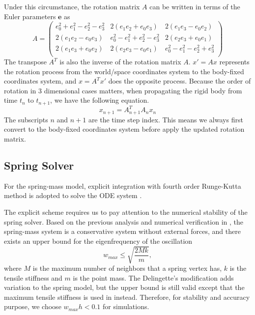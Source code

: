 Under this circumstance, the rotation matrix $A$ can be written in terms of 
the Euler parameters $\mathbf{e}$ as
\begin{equation}
A =\left(
\begin{array}{ccc}
e_0^2+e_1^2-e_2^2-e_3^2 & 2(e_1e_2+e_0e_3) & 2(e_1e_3-e_0e_2) \\
2(e_1e_2-e_0e_3) & e_0^2-e_1^2+e_2^2-e_3^2 & 2(e_2e_3+e_0e_1) \\
2(e_1e_3+e_0e_2) & 2(e_2e_3-e_0e_1) & e_0^2-e_1^2-e_2^2+e_3^2 \\
\end{array}
\right)
\label{eqn:rotation_matrix}
\end{equation}
The transpose $A^T$ is also the inverse of the rotation matrix $A$. 
$x' = Ax$ represents the rotation process from the world/space coordinates 
system to the body-fixed coordinates system, and $x = A^Tx'$ does the 
opposite process. 
Because the order of rotation in 3 dimensional cases matters, when 
propagating the rigid body from time $t_n$ to $t_{n+1}$, we have the 
following equation.
\begin{equation}
x_{n+1} = A^T_{n+1} A_n x_n
\end{equation}
The subscripts $n$ and $n+1$ are the time step index. This means we always 
first convert to the body-fixed coordinates system before apply the updated 
rotation matrix. 



\subsection{Spring Solver}
\label{Sec:SS}
For the spring-mass model, explicit integration with fourth order 
Runge-Kutta method  is adopted to solve the ODE system 
.

The explicit scheme requires us to pay attention to the numerical stability 
of the spring solver. 
Based on the previous analysis and numerical verification in 
\cite{LiChernKimLi12, KimLiLi12}, the spring-mass system is a conservative 
system without external forces, and there exists an upper bound for the 
eigenfrequency of the oscillation 
\begin{equation}
w_{max} \leq \sqrt{\frac{2Mk}{m}}, 
\label{eqn:eigenfrequency}
\end{equation}
where $M$ is the maximum number of neighbors that a spring vertex has, $k$ 
is the tensile stiffness and $m$ is the point mass. 
The Delingette's modification adds variation to the spring model, but the 
upper bound is still valid except that the maximum tensile stiffness is used 
in  instead. 
Therefore, for stability and accuracy purpose, we choose $w_{max}h < 0.1$ for 
simulations.



